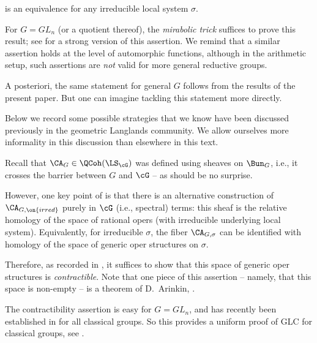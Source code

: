\documentclass[9pt]{amsart}
\theoremstyle{remark}
\theoremstyle{definition}
\theoremstyle{remark}
\numberwithin{equation}{section}
\begin{document}
\noindent is an equivalence for any irreducible local system $\sigma$.

\medskip 

For $G = GL_n$ (or a quotient thereof), the \emph{mirabolic trick}
suffices to prove this result; see \cite{Be1} for a strong version of this
assertion. We remind that a similar assertion holds at the level of automorphic
functions, although in the arithmetic setup, such assertions are \emph{not}
valid for more general reductive groups.

\medskip 

A posteriori, the same statement for general $G$ follows from the results
of the present paper. But one can imagine tackling this statement 
more directly. 

\medskip 

Below we record some possible strategies that we know have been discussed previously
in the geometric Langlands community. We allow ourselves more informality in this discussion than elsewhere in this
text. 

\label{sss:opers?}

Recall that $\CA_G \in \QCoh(\LS_\cG)$ was defined using sheaves on $\Bun_G$,
i.e., it crosses the barrier between $G$ and $\cG$ -- as should be no surprise.

\medskip

However, one key point of \cite{GLC4} is that there is an alternative construction 
of $\CA_{G,\on{irred}}$ purely
in $\cG$ (i.e., spectral) terms: this sheaf is the relative homology of the space
of rational opers (with irreducible underlying local system). Equivalently, for irreducible $\sigma$, the fiber 
$\CA_{G,\sigma}$ can be identified with homology of the space of generic oper structures on 
$\sigma$. 

\medskip

Therefore, as recorded in 
\cite[Conjecture 4.5.7]{GLC4}, it suffices to show that this space of generic oper structures is 
\emph{contractible}. Note that one piece of this assertion -- 
namely, that this space is non-empty -- is a theorem of D.~Arinkin,
\cite{Ari}. 

\medskip

The contractibility assertion is easy for 
$G=GL_n$, and has recently been established in \cite{BKS} for all classical groups. So 
this provides a uniform proof of GLC for classical groups, see \cite[Theorem 4.5.11]{GLC4}. 

\medskip
\end{document}
